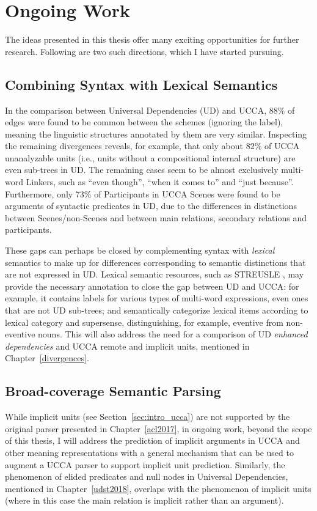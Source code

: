 \documentclass[12pt,a4paper,table]{report}
\renewcommand\cite{\citep}      %
\begin{document}
\section{Ongoing Work}

The ideas presented in this thesis offer many exciting opportunities for further research.
Following are two such directions, which I have started pursuing.

\subsection{Combining Syntax with Lexical Semantics}

In the comparison between Universal Dependencies (UD) and UCCA,
88\% of edges were found to be common between the schemes (ignoring the label),
meaning the linguistic structures annotated by them are very similar.
Inspecting the remaining divergences reveals, for example, that only
about 82\% of UCCA unanalyzable units (i.e., units without a compositional
internal structure) are even sub-trees in UD.
The remaining cases seem to be almost exclusively multi-word Linkers,
such as ``even though'', ``when it comes to'' and ``just because''.
Furthermore, only 73\% of Participants in UCCA Scenes were found to be arguments
of syntactic predicates in UD, due to the differences in distinctions between
Scenes/non-Scenes and between main relations, secondary relations and participants.

These gaps can perhaps be closed
by complementing syntax with \textit{lexical} semantics to make up for differences
corresponding to semantic distinctions that are not expressed in UD.
Lexical semantic resources, such as STREUSLE
\citep{schneider-thesis,envmwe,pssdisambig,gensuper},
may provide the necessary annotation to close the gap between UD and UCCA:
for example, it contains labels for various types of multi-word expressions,
even ones that are not UD sub-trees;
and semantically categorize lexical items according to lexical category and
supersense, distinguishing, for example, eventive from non-eventive nouns.
This will also address the need for a comparison of UD \textit{enhanced dependencies}
and UCCA remote and implicit units, mentioned in Chapter~\ref{divergences}.

\subsection{Broad-coverage Semantic Parsing}

While implicit units (see Section~\ref{sec:intro_ucca}) are not supported
by the original parser presented in Chapter~\ref{acl2017},
in ongoing work, beyond the scope of this thesis, I will address
the prediction of implicit arguments in UCCA and other meaning representations
\cite{bender2011parser,cheng2018implicit,petruck2019meaning}
with a general mechanism that can be used to augment a UCCA parser
to support implicit unit prediction.
Similarly, the phenomenon of elided predicates and null nodes in Universal Dependencies,
mentioned in Chapter~\ref{udst2018}, overlaps with the phenomenon of implicit units
(where in this case the main relation is implicit rather than an argument).
\end{document}
